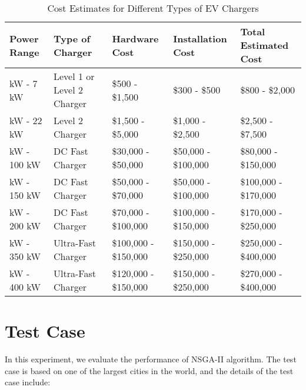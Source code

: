 \documentclass[12pt]{report}
\begin{document}
\begin{table}[h!]
    \centering
    \small %
    \begin{tabular}{|>{\raggedright\arraybackslash}p{2.5cm}|>{\raggedright\arraybackslash}p{3.5cm}|>{\raggedright\arraybackslash}p{3cm}|>{\raggedright\arraybackslash}p{3cm}|>{\raggedright\arraybackslash}p{3.5cm}|}
    \hline
    \textbf{Power Range} & \textbf{Type of Charger} & \textbf{Hardware Cost} & \textbf{Installation Cost} & \textbf{Total Estimated Cost} \\
    \hline
    3 kW - 7 kW & Level 1 or Level 2 Charger & \$500 - \$1,500 & \$300 - \$500 & \$800 - \$2,000 \\
    \hline
    7 kW - 22 kW & Level 2 Charger & \$1,500 - \$5,000 & \$1,000 - \$2,500 & \$2,500 - \$7,500 \\
    \hline
    50 kW - 100 kW & DC Fast Charger & \$30,000 - \$50,000 & \$50,000 - \$100,000 & \$80,000 - \$150,000 \\
    \hline
    100 kW - 150 kW & DC Fast Charger & \$50,000 - \$70,000 & \$50,000 - \$100,000 & \$100,000 - \$170,000 \\
    \hline
    150 kW - 200 kW & DC Fast Charger & \$70,000 - \$100,000 & \$100,000 - \$150,000 & \$170,000 - \$250,000 \\
    \hline
    200 kW - 350 kW & Ultra-Fast Charger & \$100,000 - \$150,000 & \$150,000 - \$250,000 & \$250,000 - \$400,000 \\
    \hline
    350 kW - 400 kW & Ultra-Fast Charger & \$120,000 - \$150,000 & \$150,000 - \$250,000 & \$270,000 - \$400,000 \\
    \hline
    \end{tabular}
    \caption{Cost Estimates for Different Types of EV Chargers}
    \end{table}
    


\section{Test Case}
In this experiment, we evaluate the performance of NSGA-II algorithm. The test case is based on one of the largest cities in the world, and the details of the test case include:
\end{document}
